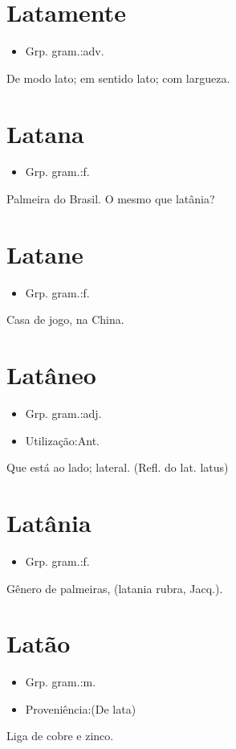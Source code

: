 \section{Latamente}
\begin{itemize}
\item {Grp. gram.:adv.}
\end{itemize}
De modo lato; em sentido lato; com largueza.
\section{Latana}
\begin{itemize}
\item {Grp. gram.:f.}
\end{itemize}
Palmeira do Brasil.
O mesmo que \textunderscore latânia\textunderscore ?
\section{Latane}
\begin{itemize}
\item {Grp. gram.:f.}
\end{itemize}
Casa de jogo, na China.
\section{Latâneo}
\begin{itemize}
\item {Grp. gram.:adj.}
\end{itemize}
\begin{itemize}
\item {Utilização:Ant.}
\end{itemize}
Que está ao lado; lateral.
(Refl. do lat. \textunderscore latus\textunderscore )
\section{Latânia}
\begin{itemize}
\item {Grp. gram.:f.}
\end{itemize}
Gênero de palmeiras, (\textunderscore latania rubra\textunderscore , Jacq.).
\section{Latão}
\begin{itemize}
\item {Grp. gram.:m.}
\end{itemize}
\begin{itemize}
\item {Proveniência:(De \textunderscore lata\textunderscore )}
\end{itemize}
Liga de cobre e zinco.
